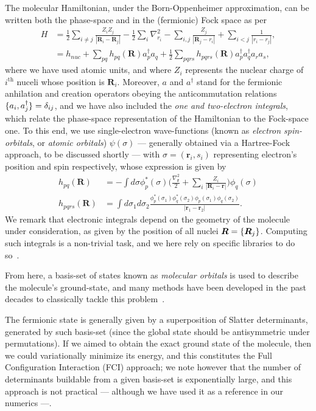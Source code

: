 The molecular Hamiltonian, under the Born-Oppenheimer approximation, can be written both the phase-space and in the (fermionic) Fock space as per
\begin{align}\label{eq:Hferm}
H &= \frac{1}{2} \sum_{i\neq j} \frac{Z_i Z_j}{|\bm{R}_i -\bm{R}_j|} - \frac{1}{2} \sum_i \nabla^2_{r_i} -  \sum_{i,j} \frac{Z_j}{|\bm{R}_j - r_i|} + \sum_{i<j} \frac{1}{|r_i - r_j|}, \\
&= h_{nuc} + \sum_{pq} h_{pq}(\mathbf{R}) a_p^\dagger a_q  + \frac{1}{2} \sum_{pqrs} h_{pqrs}(\mathbf{R}) a_p^\dagger a_q^\dagger a_r a_s,
\end{align}
where we have used atomic units, and where $Z_i$ represents the nuclear charge of $i^{\text{th}}$ nuceli whose position is $\bm{R}_i$. Moreover, $a$ and $a^\dagger$ stand for the fermionic anhilation and creation operators obeying the anticommutation relations $\lbrace a_i,a^\dagger_j\rbrace = \delta_{ij}$, and we have also included the \textit{one and two-electron integrals}, which relate the phase-space representation of the Hamiltonian to the Fock-space one. To this end, we use single-electron wave-functions (known as \textit{electron spin-orbitals}, or \textit{atomic orbitals}) $\psi(\sigma)$ --- generally obtained via a Hartree-Fock approach, to be discussed shortly --- with $\sigma = (\bm{r}_i, s_i)$ representing electron's position and spin respectively, whose expression is given by
\begin{align}h_{pq}(\bm{R}) &= - \int d\sigma \phi^*_p(\sigma) \Big(\frac{\nabla^2_{\bm{r}}}{2} + \sum_i \frac{Z_i}{|\bm{R}_i - \bm{r}|} \Big) \phi_q(\sigma) \\
h_{pqrs}(\bm{R}) &= \int d\sigma_1 d\sigma_2 \frac{\phi^*_p(\sigma_1)\phi^*_q(\sigma_2)\phi_p(\sigma_1)\phi_q(\sigma_2)}{|\bm{r}_1 - \bm{r}_2|}.
\end{align}
We remark that electronic integrals depend on the geometry of the molecule under consideration, as given by the position of all nuclei $\bm{R} = \lbrace \bm{R}_j\rbrace$. Computing such integrals is a non-trivial task, and we here rely on specific libraries to do so~\cite{mcclean2019openfermion}.

From here, a basis-set of states known as \textit{molecular orbitals} is used to describe the molecule's ground-state, and many methods have been developed in the past decades to classically tackle this problem~\cite{RevModPhys.92.015003}.

The fermionic state is generally given by a superposition of Slatter determinants, generated by such basis-set (since the global state should be antisymmetric under permutations). If we aimed to obtain the exact ground state of the molecule, then we could variationally minimize its energy, and this constitutes the Full Configuration Interaction (FCI) approach; we note however that the number of determinants buildable from a given basis-set is exponentially large, and this approach is not practical --- although we have used it as a reference in our numerics ---.

